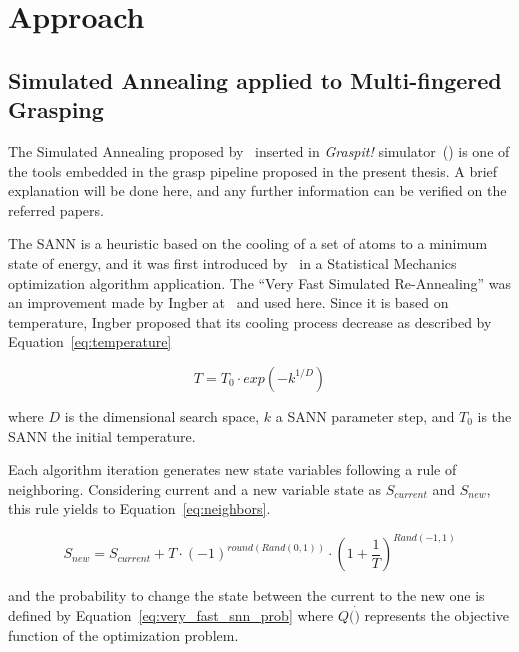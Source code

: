 \chapter[Approach]{Approach}
\label{ch:approach}


\section{Simulated Annealing applied to Multi-fingered Grasping}

The Simulated Annealing proposed by~\cite{Ciocarlie2009} inserted in \textit{Graspit!} simulator~(\cite{AndrewT2004}) is one of the tools embedded in the grasp pipeline proposed in the present thesis. A brief explanation will be done here, and any further information can be verified on the referred papers.

The \ac{SANN} is a heuristic based on the cooling of a set of atoms to a minimum state of energy, and it was first introduced by~\cite{kirkpatrick1983} in a Statistical Mechanics optimization algorithm application. The ``Very Fast Simulated Re-Annealing'' was an improvement made by Ingber at~\cite{ingber1988} and used here. Since it is based on temperature, Ingber proposed that its cooling process decrease as described by Equation~\ref{eq:temperature}

\begin{equation}
T=T_{0} \cdot exp{(-k^{1/D})}
\label{eq:temperature}
\end{equation}

\noindent
where $D$ is the dimensional search space, $k$ a \ac{SANN} parameter step, and $T_0$ is the \ac{SANN} the initial temperature.

Each algorithm iteration generates new state variables following a rule of neighboring. Considering current and a new variable state as $S_{current}$ and $S_{new}$, this rule yields to Equation~\ref{eq:neighbors}.

\begin{equation}
S_{new}=S_{current}+T \cdot(-1)^{round(Rand(0,1))} \cdot\left(1+\frac{1}{T}\right)^{Rand(-1,1)}
\label{eq:neighbors}
\end{equation}

and the probability to change the state between the current to the new one is defined by Equation~\ref{eq:very_fast_snn_prob} where $Q( \dot )$ represents the objective function of the optimization problem.

